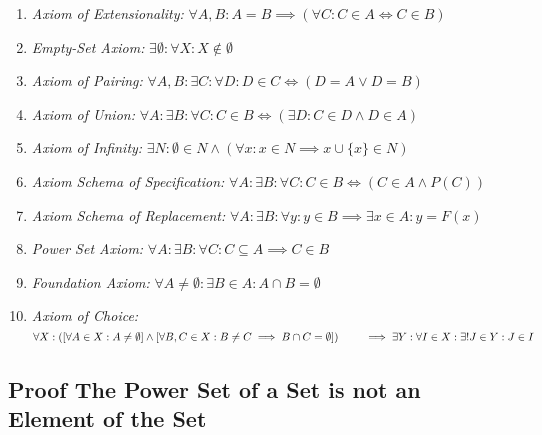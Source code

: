 \begin{enumerate}[label = \Roman*.]
	
	\item \emph{Axiom of Extensionality:} \quad \(\forall A, B: A = B \implies (\forall C: C \in A 
	      \iff C \in B)\)
	
	\item \emph{Empty-Set Axiom:} \quad \(\exists \emptyset : \forall X: X \notin \emptyset\)
	
	\item \emph{Axiom of Pairing:} \quad \(\forall A, B: \exists C: \forall D: D \in C \iff (D = A \lor 
	      D = B)\)	
	
	\item \emph{Axiom of Union:} \quad \(\forall A: \exists B: \forall C: C \in B \iff (\exists D: C 
	      \in D \land D \in A)\)
	
	\item \emph{Axiom of Infinity:} \quad \(\exists N: \emptyset \in N \land (\forall x: x \in N \implies 
	      x \cup \{x\} \in N)\)
	
	\item \emph{Axiom Schema of Specification:} \quad \(\forall A: \exists B: \forall C: C \in B \iff 
	      (C \in A \land P(C))\)
	
	\item \emph{Axiom Schema of Replacement:} \quad \(\forall A: \exists B: \forall y: y \in B \implies 
	      \exists x \in A: y = F(x)\)
	
	\item \emph{Power Set Axiom:} \quad \(\forall A: \exists B: \forall C: C \subseteq A \implies C \in B\)
	
	\item \emph{Foundation Axiom:} \quad \(\forall A \ne \emptyset: \exists B \in A: A \cap B = \emptyset\)
	
	\item \emph{Axiom of Choice:} \quad \(\forall X:
		      \left( \left[ \forall A \in X: A \ne \emptyset \right] \land
		      \left[ \forall B, C \in X: B \ne C \implies B \cap C = \emptyset \right] \right) \\
		      \qquad \implies \exists Y: \forall I \in X: \exists! J \in Y: J \in I\)

\end{enumerate}

\subsection{Proof The Power Set of a Set is not an Element of the Set}

